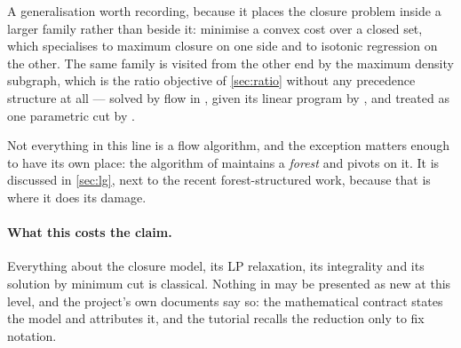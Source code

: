 A generalisation worth recording, because it places the closure problem inside a
larger family rather than beside it: \citet{HochbaumQueyranne2003} minimise a
convex cost over a closed set, which specialises to maximum closure on one side
and to isotonic regression on the other. The same family is visited from the
other end by the maximum density subgraph, which is the ratio objective of
\cref{sec:ratio} without any precedence structure at all --- solved by flow in
\citet{Goldberg1984}, given its linear program by \citet{Charikar2000}, and
treated as one parametric cut by \citet{Hochbaum2024}.

Not everything in this line is a flow algorithm, and the exception matters
enough to have its own place: the algorithm of \citet{LerchsGrossmann1965}
maintains a \emph{forest} and pivots on it. It is discussed in \cref{sec:lg},
next to the recent forest-structured work, because that is where it does its
damage.

\paragraph{What this costs the claim.} Everything about the closure model, its
LP relaxation, its integrality and its solution by minimum cut is classical.
Nothing in \FS{} may be presented as new at this level, and the project's own
documents say so: the mathematical contract states the model and attributes it,
and the tutorial recalls the reduction only to fix notation.
